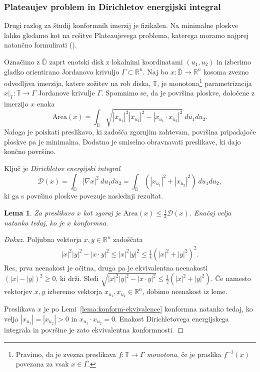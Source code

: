 \documentclass[12pt,a4paper,twoside]{article}
\theoremstyle{definition} %
\newenvironment{dokaz}[1][Dokaz]{\begin{proof}[#1]}{\end{proof}}
\theoremstyle{plain} %
\newtheorem{lema}[definicija]{Lema}
\numberwithin{equation}{section}  %
\begin{document}
\subsubsection{Plateaujev problem in Dirichletov energijski integral}
%
Drugi razlog za študij konformnih imerzij je fizikalen. Na minimalne ploskve lahko gledamo kot na rešitve Plateaujevega problema, katerega moramo najprej natančno formulirati (\cite[Section~2.1]{lawson1980lectures}).

Označimo z $\overline{\mathbb{D}}$ zaprt enotski disk z lokalnimi koordinatami $(u_{1}, u_{2})$ in izberimo gladko orientirano Jordanovo krivuljo $\Gamma \subset \mathbb{R}^{n}$.
Naj bo $x \colon \overline{\mathbb{D}} \to \mathbb{R}^{n}$ kosoma zvezno odvedljiva imerzija, katere zožitev na rob diska, $\mathbb{T}$, je monotona\footnote{Pravimo, da je zvezna preslikava $f \colon \mathbb{T} \to \Gamma$ \emph{monotona}, če je praslika $f^{-1}(x)$ povezana za vsak $x \in \Gamma$.} parametrizacija $x|_{\mathbb{T}} \colon \mathbb{T} \to \Gamma$ Jordanove krivulje $\Gamma$.
Spomnimo se, da je površina ploskve, določene z imerzijo $x$ enaka
\begin{equation} \label{eq:area}
\text{Area}(x) = \int_{\mathbb{D}} \sqrt{|x_{u_1}|^2 |x_{u_2}|^2 - |x_{u_1} \cdot x_{u_2}|^2} \ du_{1}du_{2}.
\end{equation}
Naloga je poiskati preslikavo, ki zadošča zgornjim zahtevam, površina pripadajoče ploskve pa je minimalna. Dodatno je smiselno obravnavati preslikave, ki dajo končno površino.

Ključ je \emph{Dirichletov energijski integral} 
\begin{equation} \label{eq:Dirichlet-int}
\mathcal{D}(x) = \int_{\mathbb{D}} |\nabla x|^2 \ du_{1}du_{2} = \int_{\mathbb{D}} (|x_{u_1}|^2 + |x_{u_2}|^2) \ du_{1}du_{2},
\end{equation}
ki ga s površino ploskve povezuje naslednji rezultat.

\begin{lema} \label{lema:Area<=D/2}
Za preslikavo $x$ kot zgoraj je $\mathrm{Area}(x) \leq \frac{1}{2} \mathcal{D}(x)$. Enačaj velja natanko tedaj, ko je $x$ konformna.
\end{lema}

\begin{dokaz}
Poljubna vektorja $x,y \in \mathbb{R}^{n}$ zadoščata
\begin{gather*}
|x|^2 |y|^2 - |x \cdot y|^2 \leq |x|^2 |y|^2 \leq \frac{1}{4} (|x|^2 + |y|^2)^2.
\end{gather*}
Res, prva neenakost je očitna, druga pa je ekvivalentna neenakosti $(|x|-|y|)^2 \geq 0$, ki drži.
Sledi $\sqrt{|x|^2 |y|^2 - |x \cdot y|^2} \leq \frac{1}{2} (|x|^2 + |y|^2)$. Če namesto vektorjev $x,y$ izberemo vektorja $x_{u_1}, x_{u_2} \in \mathbb{R}^{n}$, dobimo neenakost iz leme.

Preslikava $x$ je po Lemi~\ref{lema:konform-ekvivalence} konformna natanko tedaj, ko velja $|x_{u_1}| = |x_{u_2}| > 0$ in $x_{u_1} \cdot x_{u_2} = 0$. Enakost Dirichletovega energijskega integrala in površine je zato ekvivalentna konformnosti.
\end{dokaz}
\end{document}
